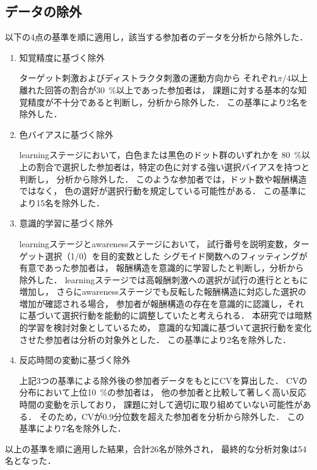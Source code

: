 \subsection{データの除外}
以下の4点の基準を順に適用し，該当する参加者のデータを分析から除外した．

\begin{enumerate}
\item 知覚精度に基づく除外

ターゲット刺激およびディストラクタ刺激の運動方向から
それぞれ$\pi/4$以上離れた回答の割合が30~\%以上であった参加者は，
課題に対する基本的な知覚精度が不十分であると判断し，分析から除外した．
この基準により2名を除外した．

\item 色バイアスに基づく除外

learningステージにおいて，白色または黒色のドット群のいずれかを
80~\%以上の割合で選択した参加者は，特定の色に対する強い選択バイアスを持つと判断し，
分析から除外した．
このような参加者では，ドット数や報酬構造ではなく，
色の選好が選択行動を規定している可能性がある．
この基準により15名を除外した．

\item 意識的学習に基づく除外

learningステージとawarenessステージにおいて，
試行番号を説明変数，ターゲット選択（1/0）を目的変数とした
シグモイド関数へのフィッティングが有意であった参加者は，
報酬構造を意識的に学習したと判断し，分析から除外した．
learningステージでは高報酬刺激への選択が試行の進行とともに増加し，
さらにawarenessステージでも反転した報酬構造に対応した選択の増加が確認される場合，
参加者が報酬構造の存在を意識的に認識し，それに基づいて選択行動を能動的に調整していたと考えられる．
本研究では暗黙的学習を検討対象としているため，
意識的な知識に基づいて選択行動を変化させた参加者は分析の対象外とした．
この基準により2名を除外した．

\item 反応時間の変動に基づく除外

上記3つの基準による除外後の参加者データをもとにCVを算出した．
CVの分布において上位10~\%の参加者は，
他の参加者と比較して著しく高い反応時間の変動を示しており，
課題に対して適切に取り組めていない可能性がある．
そのため，CVが0.9分位数を超えた参加者を分析から除外した．
この基準により7名を除外した．

\end{enumerate}

以上の基準を順に適用した結果，合計26名が除外され，
最終的な分析対象は54名となった．

